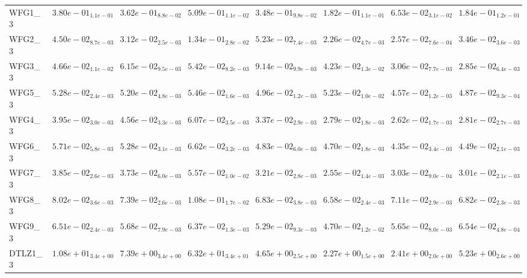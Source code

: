 \documentclass{article}
\begin{document}
\begin{landscape}
\begin{table}
\begin{scriptsize}
\begin{tabular}{llllllll}
WFG1\_3 & $  3.80e-01_{ 1.1e-01}$ & $  3.62e-01_{ 8.8e-02}$ & $  5.09e-01_{ 1.1e-02}$ & $  3.48e-01_{ 9.8e-02}$ & \cellcolor{gray25}$  1.82e-01_{ 1.1e-01}$ & \cellcolor{gray95}$  6.53e-02_{ 3.1e-02}$ & $  1.84e-01_{ 1.2e-01}$ \\
WFG2\_3 & $  4.50e-02_{ 8.7e-03}$ & $  3.12e-02_{ 2.5e-03}$ & $  1.34e-01_{ 2.8e-02}$ & $  5.23e-02_{ 7.4e-03}$ & \cellcolor{gray95}$  2.26e-02_{ 4.7e-03}$ & \cellcolor{gray25}$  2.57e-02_{ 7.6e-04}$ & $  3.46e-02_{ 3.6e-03}$ \\
WFG3\_3 & $  4.66e-02_{ 1.1e-02}$ & $  6.15e-02_{ 9.5e-03}$ & $  5.42e-02_{ 8.2e-03}$ & $  9.14e-02_{ 9.9e-03}$ & $  4.23e-02_{ 1.3e-02}$ & \cellcolor{gray25}$  3.06e-02_{ 7.7e-03}$ & \cellcolor{gray95}$  2.85e-02_{ 6.4e-03}$ \\
WFG5\_3 & $  5.28e-02_{ 2.4e-03}$ & $  5.20e-02_{ 4.8e-03}$ & $  5.46e-02_{ 1.6e-03}$ & $  4.96e-02_{ 1.2e-03}$ & $  5.23e-02_{ 1.0e-02}$ & \cellcolor{gray95}$  4.57e-02_{ 1.2e-03}$ & \cellcolor{gray25}$  4.87e-02_{ 9.3e-04}$ \\
WFG4\_3 & $  3.95e-02_{ 3.0e-03}$ & $  4.56e-02_{ 3.3e-03}$ & $  6.07e-02_{ 3.5e-03}$ & $  3.37e-02_{ 2.9e-03}$ & \cellcolor{gray25}$  2.79e-02_{ 1.8e-03}$ & \cellcolor{gray95}$  2.62e-02_{ 1.7e-03}$ & $  2.81e-02_{ 2.7e-03}$ \\
WFG6\_3 & $  5.71e-02_{ 5.8e-03}$ & $  5.28e-02_{ 3.1e-03}$ & $  6.62e-02_{ 3.2e-03}$ & $  4.83e-02_{ 6.0e-03}$ & $  4.70e-02_{ 1.8e-03}$ & \cellcolor{gray95}$  4.35e-02_{ 3.4e-03}$ & \cellcolor{gray25}$  4.49e-02_{ 2.1e-03}$ \\
WFG7\_3 & $  3.85e-02_{ 2.6e-03}$ & $  3.73e-02_{ 6.0e-03}$ & $  5.57e-02_{ 1.0e-02}$ & $  3.21e-02_{ 2.8e-03}$ & \cellcolor{gray95}$  2.55e-02_{ 1.4e-03}$ & $  3.03e-02_{ 9.0e-04}$ & \cellcolor{gray25}$  3.01e-02_{ 2.1e-03}$ \\
WFG8\_3 & $  8.02e-02_{ 3.6e-03}$ & $  7.39e-02_{ 2.6e-03}$ & $  1.08e-01_{ 1.7e-02}$ & $  6.83e-02_{ 3.8e-03}$ & \cellcolor{gray95}$  6.58e-02_{ 2.4e-03}$ & $  7.11e-02_{ 2.9e-03}$ & \cellcolor{gray25}$  6.82e-02_{ 2.3e-03}$ \\
WFG9\_3 & $  6.51e-02_{ 2.4e-03}$ & $  5.68e-02_{ 7.9e-03}$ & $  6.37e-02_{ 1.3e-03}$ & \cellcolor{gray25}$  5.29e-02_{ 9.3e-03}$ & \cellcolor{gray95}$  4.70e-02_{ 1.2e-02}$ & $  5.65e-02_{ 8.0e-03}$ & $  6.54e-02_{ 4.8e-04}$ \\
DTLZ1\_3 & $  1.08e+01_{ 3.4e+00}$ & $  7.39e+00_{ 3.4e+00}$ & $  6.32e+01_{ 3.4e+01}$ & $  4.65e+00_{ 2.5e+00}$ & \cellcolor{gray95}$  2.27e+00_{ 1.5e+00}$ & \cellcolor{gray25}$  2.41e+00_{ 2.0e+00}$ & $  5.23e+00_{ 2.6e+00}$ \\

\end{tabular}
\end{scriptsize}
\end{table}
\end{landscape}
\end{document}
